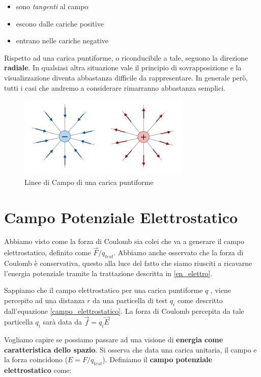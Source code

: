 \begin{itemize}
	\item sono \textit{tangenti} al campo
	\item escono dalle cariche positive
	\item entrano nelle cariche negative
\end{itemize}

Rispetto ad una carica puntiforme, o riconducibile a tale, seguono la direzione \textbf{radiale}. In qualsiasi altra situazione vale il principio di sovrapposizione e la visualizzazione diventa abbastanza difficile da rappresentare. In generale però, tutti i casi che andremo a considerare rimarranno abbastanza semplici. 

\begin{figure}[ht]
	\centering
	\includegraphics[width=0.7\linewidth]{Media/Linee_Campo}
	\caption{Linee di Campo di una carica puntiforme}
	\label{fig:lineecampo}
\end{figure}


\section{Campo Potenziale Elettrostatico}
 Abbiamo visto come la forza di Coulomb sia colei che va a generare il campo elettrostatico, definito come $\vec{F}/q_{test}$. Abbiamo anche osservato che la forza di Coulomb è conservativa, questo alla luce del fatto che siamo riusciti a ricavarne l'energia potenziale tramite la trattazione descritta in \ref{en_elettro}.
 
 Sappiamo che il campo elettrostatico per una carica puntiforme $q$ , viene percepito ad una distanza $r$ da una particella di test $q_i$ come descritto dall'equazione \ref{campo_elettrostatico}. La forza di Coulomb percepita da tale particella $q_i$ sarà data da $\vec{f} = q_i \vec{E}$ 
 
 Vogliamo capire se possiamo passare ad una visione di \textbf{energia come caratteristica dello spazio}. Si osserva che data una carica unitaria, il campo e la forza coincidono ($E  = F/q_{test}$). Definiamo il \textbf{campo potenziale elettrostatico} come: 
 
